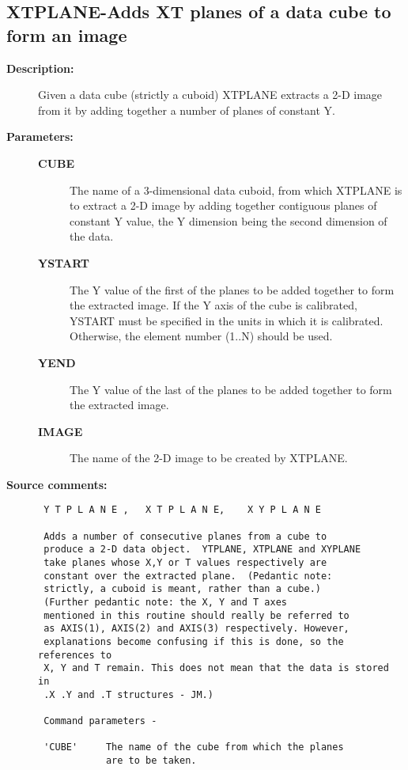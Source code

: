 \subsection{XTPLANE-\label{XTPLANE}Adds XT planes of a data cube to form an image}
\begin{description}

\item [{\bf Description:}]
 Given a data cube (strictly a cuboid) XTPLANE extracts a 2-D image
 from it by adding together a number of planes of constant Y.

\item [{\bf Parameters:}]
\begin{description}
\item [{\bf CUBE}]
 The name of a 3-dimensional data cuboid,
 from which XTPLANE is to extract a 2-D image by adding
 together contiguous planes of constant Y value, the
 Y dimension being the second dimension of the data.
\item [{\bf YSTART}]
 The Y value of the first of the planes to
 be added together to form the extracted image.  If
 the Y axis of the cube is calibrated, YSTART must be
 specified in the units in which it is calibrated.
 Otherwise, the element number (1..N) should be used.
\item [{\bf YEND}]
 The Y value of the last of the planes to
 be added together to form the extracted image.
\item [{\bf IMAGE}]
 The name of the 2-D image to be created by XTPLANE.
\end{description}

\item [{\bf Source comments:}]
\begin{verbatim}
 Y T P L A N E ,   X T P L A N E,    X Y P L A N E

 Adds a number of consecutive planes from a cube to
 produce a 2-D data object.  YTPLANE, XTPLANE and XYPLANE
 take planes whose X,Y or T values respectively are
 constant over the extracted plane.  (Pedantic note:
 strictly, a cuboid is meant, rather than a cube.)
 (Further pedantic note: the X, Y and T axes
 mentioned in this routine should really be referred to
 as AXIS(1), AXIS(2) and AXIS(3) respectively. However,
 explanations become confusing if this is done, so the references to
 X, Y and T remain. This does not mean that the data is stored in
 .X .Y and .T structures - JM.)

 Command parameters -

 'CUBE'     The name of the cube from which the planes
            are to be taken.


\end{verbatim}
\end{description}
